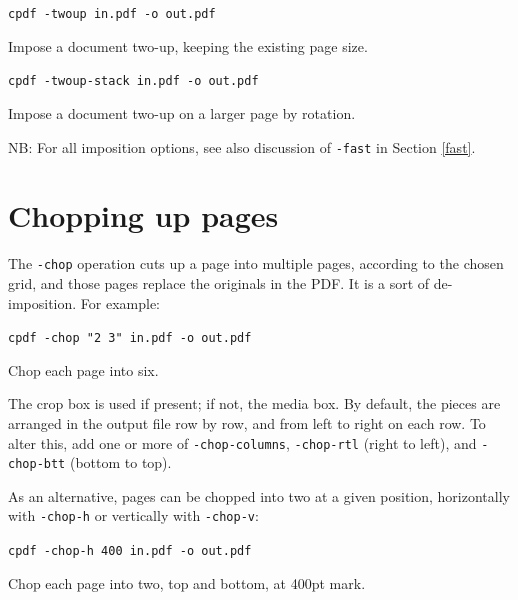 \documentclass{book}
\begin{document}
  \begin{framed}
    \noindent\small\verb!cpdf -twoup in.pdf -o out.pdf!
 
    \vspace{2.5mm}
    \noindent Impose a document two-up, keeping the existing page size.

    \vspace{2.5mm}
    \noindent\small\verb!cpdf -twoup-stack in.pdf -o out.pdf!
 
    \vspace{2.5mm}
    \noindent Impose a document two-up on a larger page by rotation. 
  \end{framed}
 
\noindent NB: For all imposition options, see also discussion of \texttt{-fast} in Section \ref{fast}.

\section{Chopping up pages}


The \texttt{-chop} operation cuts up a page into multiple pages, according to the chosen grid, and those pages replace the originals in the PDF. It is a sort of de-imposition. For example:

  \begin{framed}
    \noindent\small\verb!cpdf -chop "2 3" in.pdf -o out.pdf!
 
    \vspace{2.5mm}
    \noindent Chop each page into six.
  \end{framed}

\noindent The crop box is used if present; if not, the media box. By default, the pieces are arranged in the output file row by row, and from left to right on each row. To alter this, add one or more of \texttt{-chop-columns}, \texttt{-chop-rtl} (right to left), and \texttt{-chop-btt} (bottom to top).

As an alternative, pages can be chopped into two at a given position, horizontally with \texttt{-chop-h} or vertically with \texttt{-chop-v}:

  \begin{framed}
    \noindent\small\verb!cpdf -chop-h 400 in.pdf -o out.pdf!
 
    \vspace{2.5mm}
    \noindent Chop each page into two, top and bottom, at 400pt mark.
  \end{framed}
\end{document}

